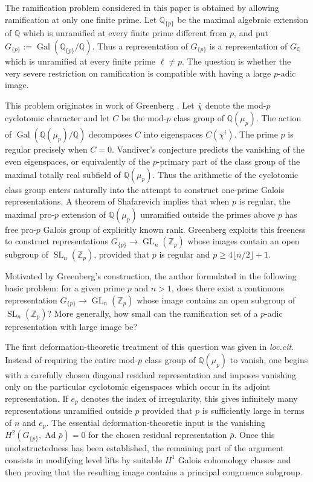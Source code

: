\documentclass[11pt]{amsart}
\numberwithin{equation}{section}
\newcommand{\Q}{\mathbb Q}
\newcommand{\Zp}{\mathbb Z_p}
\newcommand{\Gal}{\operatorname{Gal}}
\newcommand{\Ad}{\operatorname{Ad}}
\newcommand{\SL}{\operatorname{SL}}
\newcommand{\GL}{\operatorname{GL}}
\theoremstyle{definition}
\begin{document}
\par The ramification problem considered in this paper is obtained
by allowing ramification at only one finite prime. Let
$\Q_{\{p\}}$ be the maximal algebraic extension of $\Q$ which is
unramified at every finite prime different from $p$, and put $G_{\{p\}}
        :=
        \Gal(\Q_{\{p\}}/\Q)$. Thus a representation of $G_{\{p\}}$ is a representation of
$G_\Q$ which is unramified at every finite prime $\ell\neq p$. The
question is whether the very severe restriction on ramification is
compatible with having a large $p$-adic image.

\par This problem originates in work of Greenberg
\cite{Greenberg2016}. Let
$\bar\chi$ denote the mod-$p$ cyclotomic character and let $C$ be the
mod-$p$ class group of $\Q(\mu_p)$. The action of
$\Gal(\Q(\mu_p)/\Q)$ decomposes $C$ into eigenspaces
$C(\bar\chi^i)$. The prime $p$ is regular precisely when $C=0$.
Vandiver's conjecture predicts the vanishing of the even eigenspaces,
or equivalently of the $p$-primary part of the class group of the
maximal totally real subfield of $\Q(\mu_p)$. Thus the arithmetic of
the cyclotomic class group enters naturally into the attempt to
construct one-prime Galois representations. A theorem of Shafarevich
implies that when $p$ is regular, the maximal pro-$p$ extension of
$\Q(\mu_p)$ unramified outside the primes above $p$ has free pro-$p$ Galois
group of explicitly known rank. Greenberg exploits this freeness to
construct representations $G_{\{p\}}\longrightarrow\GL_n(\Zp)$
whose images contain an open subgroup of $\SL_n(\Zp)$, provided that
$p$ is regular and 
$p\geq4\lfloor n/2\rfloor+1$.


\par Motivated by Greenberg's construction, the author formulated in
\cite{Ray2021} the following basic problem: for a given prime $p$ and
$n>1$, does there exist a continuous representation
$G_{\{p\}}\to\GL_n(\Zp)$ whose image contains an open subgroup of
$\SL_n(\Zp)$? More generally, how small can the ramification set of a
$p$-adic representation with large image be?

\par The first deformation-theoretic treatment of this question was given
in \emph{loc.cit}. Instead of requiring the entire mod-$p$ class group
of $\Q(\mu_p)$ to vanish, one begins with a carefully chosen diagonal
residual representation and imposes vanishing only on the particular
cyclotomic eigenspaces which occur in its adjoint representation. If
$e_p$ denotes the index of irregularity, this gives infinitely many
representations unramified outside $p$ provided that $p$ is
sufficiently large in terms of $n$ and $e_p$. The essential
deformation-theoretic input is the vanishing $H^2(G_{\{p\}},\Ad\bar\rho)=0$ for the chosen residual representation $\bar\rho$. Once this
unobstructedness has been established, the remaining part of the
argument consists in modifying level lifts
by suitable $H^1$ Galois cohomology classes and then proving that the resulting image
contains a principal congruence subgroup.
\end{document}
